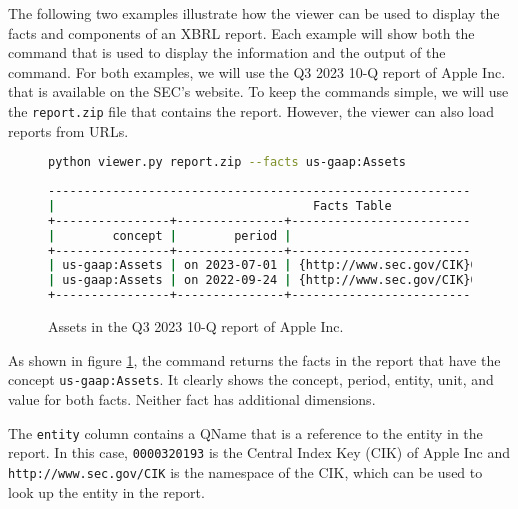The following two examples illustrate how the viewer can be used to display the facts and components of an XBRL report.
Each example will show both the command that is used to display the information and the output of the command.
For both examples, we will use the Q3 2023 10-Q report of Apple Inc. that is available on the SEC's website\cite{aapl_10q_2023_q3}.
To keep the commands simple, we will use the \texttt{report.zip} file that contains the report.
However, the viewer can also load reports from URLs.

\begin{figure}[H]
    \centering
    \begin{lstlisting}[language=bash]
python viewer.py report.zip --facts us-gaap:Assets
\end{lstlisting}
    \begin{lstlisting}[language=bash, basicstyle=\scriptsize\ttfamily]
--------------------------------------------------------------------------------------------+
|                                    Facts Table                                            |
+----------------+---------------+------------------------------------+------+--------------+
|        concept |        period |                             entity | unit |        value |
+----------------+---------------+------------------------------------+------+--------------+
| us-gaap:Assets | on 2023-07-01 | {http://www.sec.gov/CIK}0000320193 |  usd | 335038000000 |
| us-gaap:Assets | on 2022-09-24 | {http://www.sec.gov/CIK}0000320193 |  usd | 352755000000 |
+----------------+---------------+------------------------------------+------+--------------+
\end{lstlisting}
    \caption{Assets in the Q3 2023 10-Q report of Apple Inc.}
    \label{fig:aapl_assets}
\end{figure}

As shown in figure \ref{fig:aapl_assets}, the command returns the facts in the report that have the concept \texttt{us-gaap:Assets}.
It clearly shows the concept, period, entity, unit, and value for both facts.
Neither fact has additional dimensions.

The \texttt{entity} column contains a QName that is a reference to the entity in the report.
In this case, \texttt{0000320193} is the Central Index Key (CIK) of Apple Inc
and \texttt{http://www.sec.gov/CIK} is the namespace of the CIK, which can be used to look up the entity in the report.

